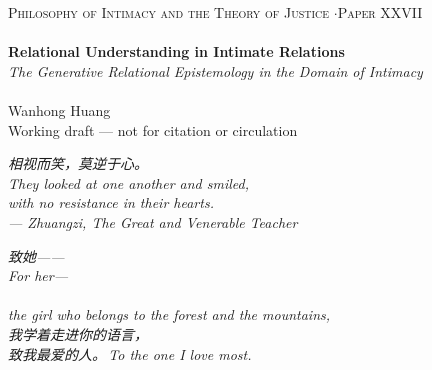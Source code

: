 \documentclass[11pt,a4paper]{article}
\begin{document}
\thispagestyle{empty}
\begin{center}
\vspace*{2cm}
{\footnotesize\color{rosedeep}\scshape Philosophy of Intimacy and the Theory of Justice \quad$\cdot$\quad Paper XXVII}\\[0.3cm]
\coverrule\\[1.2cm]
{\LARGE\bfseries\color{warnred} Relational Understanding in Intimate Relations}\\[0.7cm]
{\large\itshape\color{warnred} The Generative Relational Epistemology in the Domain of Intimacy}\\[1.6cm]
\coverrule[0.25]\\[0.6cm]
{\normalsize\color{inksoft} Wanhong Huang}\\
\vfill
{\footnotesize\color{gold} Working draft --- not for citation or circulation}
\coverfootnote
\end{center}
\newpage

\thispagestyle{empty}
\vspace*{2.4cm}
\begin{center}
\begin{minipage}{0.76\linewidth}
\centering\itshape\color{rose}
{\cjk 相视而笑，莫逆于心。}\\[0.35em]
They looked at one another and smiled,\\[0.1em]
with no resistance in their hearts.\\[1.2em]
{\upshape\footnotesize\color{gold} --- \emph{Zhuangzi}, \emph{The Great and Venerable Teacher}}
\end{minipage}
\end{center}
\newpage

\thispagestyle{empty}
\vspace*{4.5cm}
\begin{center}
\begin{minipage}{0.74\linewidth}
\centering\itshape\color{rose}
{\cjk 致她——}\\[0.3em]
For her---\\[0.7em]
\\[0.2em]
the girl who belongs to the forest and the mountains,\\[0.5em]
{\cjk 我学着走进你的语言，}\\[0.2em]
{\upshape\footnotesize\color{gold} {\cjk 致我最爱的人。}\,\;To the one I love most.}
\end{minipage}
\end{center}
\newpage
\end{document}
